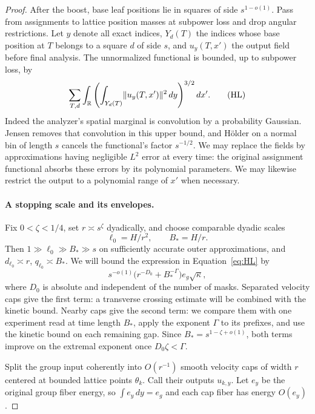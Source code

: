 \begin{proof}
After the boost, base leaf positions lie in squares of side
$s^{1-o(1)}$. Pass from assignments to lattice position masses at
subpower loss and drop angular restrictions. Let $y$ denote all exact
indices, $Y_d(T)$ the indices whose base position at $T$ belongs to a
square $d$ of side $s$, and $u_y(T,x')$ the output field before final
analysis. The unnormalized functional is bounded, up to subpower loss,
by
\begin{equation}
 \sum_{T,d}\int_\mathbb R
 \left(\int_{Y_d(T)}\lVert u_y(T,x')\rVert^2\,dy\right)^{3/2}dx'.
 \tag{HL}\label{eq:HL}
\end{equation}
Indeed the analyzer's spatial marginal is convolution by a probability
Gaussian. Jensen removes that convolution in this upper bound, and
H\"older on a normal bin of length $s$ cancels the functional's factor
$s^{-1/2}$. We may replace the fields by approximations having negligible
$L^2$ error at every time: the original assignment functional absorbs
these errors by its polynomial parameters. We may likewise restrict
the output to a polynomial range of $x'$ when necessary.

\paragraph{A stopping scale and its envelopes.}
Fix $0<\zeta<1/4$, set $r\asymp s^\zeta$ dyadically, and choose
comparable dyadic scales
\[
 \ell_0=H/r^2,\qquad B_*=H/r.
\]
Then $1\gg\ell_0\gg B_*\gg s$ on sufficiently accurate outer
approximations, and
$d_{\ell_0}\asymp r$, $q_{\ell_0}\asymp B_*$.
We will bound the expression in Equation~\eqref{eq:HL} by
\[
 s^{-o(1)}\bigl(r^{-D_0}+B_*^{-\Gamma}\bigr)e_g\sqrt\kappa,
\]
where $D_0$ is absolute and independent of the number of masks.
Separated velocity caps give the first term: a transverse crossing
estimate will be combined with the kinetic bound. Nearby caps give the
second term: we compare them with one experiment read at time length
$B_*$, apply the exponent $\Gamma$ to its prefixes, and use the kinetic
bound on each remaining gap. Since $B_*=s^{1-\zeta+o(1)}$, both terms
improve on the extremal exponent once $D_0\zeta<\Gamma$.

Split the group input coherently into $O(r^{-1})$ smooth velocity caps
of width $r$ centered at bounded lattice points $\theta_k$. Call their
outputs $u_{k,y}$. Let $e_y$ be the original group fiber energy, so
$\int e_y\,dy=e_g$ and each cap fiber has energy $O(e_y)$.


\end{proof}
